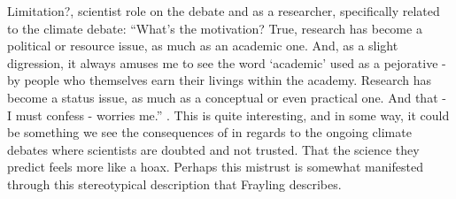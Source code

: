Limitation?, scientist role on the debate and as a researcher, specifically related to the climate debate:
“What’s the motivation? True, research has become a political or resource issue, as much as an academic one. And, as a slight digression, it always amuses me to see the word ‘academic’ used as a pejorative - by people who themselves earn their livings within the academy. Research has become a status issue, as much as a conceptual or even practical one. And that - I must confess - worries me.” \autocite[p. 5]{frayling_1994}. This is quite interesting, and in some way, it could be something we see the consequences of in regards to the ongoing climate debates where scientists are doubted and not trusted. That the science they predict feels more like a hoax. Perhaps this mistrust is somewhat manifested through this stereotypical description that Frayling describes.